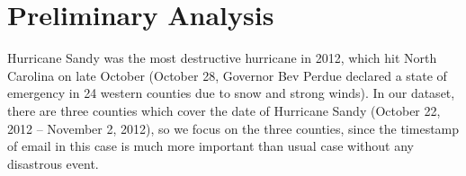 \documentclass[a4paper]{article}
\begin{document}

\section{Preliminary Analysis}
Hurricane Sandy was the most destructive hurricane in 2012, which hit North Carolina on late October (October 28, Governor Bev Perdue declared a state of emergency in 24 western counties due to snow and strong winds). In our dataset, there are three counties which cover the date of Hurricane Sandy (October 22, 2012 – November 2, 2012), so we focus on the three counties, since the timestamp of email in this case is much more important than usual case without any disastrous event.
\end{document}
